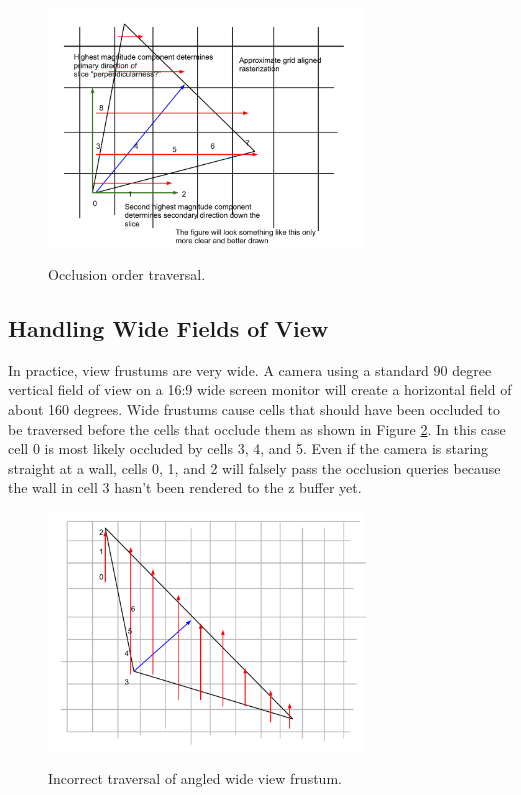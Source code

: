 \documentclass[12pt]{ucthesis}
\newcommand{\captionfonts}{\small\bf\ssp}
\begin{document}
\begin{figure}
\begin{center}
\includegraphics[width=0.75\textwidth]{Images/frustum-iter.pdf}
\captionfonts
\caption[View Frustum Traversal]{Occlusion order traversal.}
\label{fig:frustum-iter}
\end{center}
\end{figure}

\subsection{Handling Wide Fields of View}
\label{handling-wide-fields-of-view}

In practice, view frustums are very wide.
A camera using a standard 90 degree vertical field of view on a 16:9 wide screen monitor will create a horizontal field of about 160 degrees.
Wide frustums cause cells that should have been occluded to be traversed before the cells that occlude them as shown in Figure \ref{fig:wide-frustum-iter}.
In this case cell 0 is most likely occluded by cells 3, 4, and 5.
Even if the camera is staring straight at a wall, cells 0, 1, and 2 will falsely pass the occlusion queries because the wall in cell 3 hasn't been rendered to the z buffer yet.

\begin{figure}
\begin{center}
\includegraphics[width=0.75\textwidth]{Images/wide-frustum.pdf}
\captionfonts
\caption[Incorrect Wide View Frustum Traversal]{Incorrect traversal of angled wide view frustum.}
\label{fig:wide-frustum-iter}
\end{center}
\end{figure}
\end{document}
